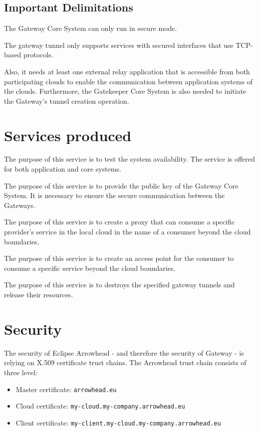 \documentclass[a4paper]{arrowhead}
\begin{document}
\subsection{Important Delimitations}
\label{sec:delimitations}

The Gateway Core System can only run in secure mode.

The gateway tunnel only supports services with secured interfaces that use TCP-based protocols.

Also, it needs at least one external relay application that is accessible from both participating clouds to enable the communication between application systems of the clouds. Furthermore, the Gatekeeper Core System is also needed to initiate the Gateway's tunnel creation operation.

\newpage

\section{Services produced}
\label{sec:services}

The purpose of this service is to test the system availability. The service is offered for both application and core systems. 

The purpose of this service is to provide the public key of the Gateway Core System. It is necessary to ensure the secure communication between the Gateways. 

The purpose of this service is to create a proxy that can consume a specific provider's service in the local cloud in the name of a consumer beyond the cloud boundaries.

The purpose of this service is to create an access point for the consumer to consume a specific service beyond the cloud boundaries. 

The purpose of this service is to destroys the specified gateway tunnels and release their resources.

\newpage

\section{Security}
\label{sec:security}

The security of Eclipse Arrowhead - and therefore the security of Gateway - is relying on X.509 certificate trust chains. The Arrowhead trust chain consists of three level:
\begin{itemize}
    \item Master certificate: \texttt{arrowhead.eu}
    \item Cloud certificate: \texttt {my-cloud.my-company.arrowhead.eu}
    \item Client certificate: \texttt{my-client.my-cloud.my-company.arrowhead.eu}
\end{itemize}
\end{document}
